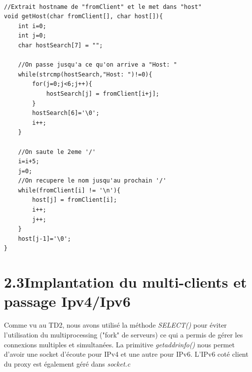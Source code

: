 \documentclass[12pt, a4paper]{report}
\begin{document}
\lstset{language=C}

\renewcommand{\lstlistingname}{Algorithm 2.2.}
\begin{lstlisting}[caption=Algorithme de détermination d'adresse serveur à contacter (messages.c)]

//Extrait hostname de "fromClient" et le met dans "host"
void getHost(char fromClient[], char host[]){
	int i=0;
	int j=0;
	char hostSearch[7] = "";

	//On passe jusqu'a ce qu'on arrive a "Host: "
	while(strcmp(hostSearch,"Host: ")!=0){
		for(j=0;j<6;j++){
			hostSearch[j] = fromClient[i+j];
		}
		hostSearch[6]='\0';
		i++;
	}
	
	//On saute le 2eme '/'
	i=i+5;
	j=0;
	//On recupere le nom jusqu'au prochain '/'
	while(fromClient[i] != '\n'){
		host[j] = fromClient[i];
		i++;
		j++;
	}
	host[j-1]='\0';
}

\end{lstlisting}

\newpage


\section*{\hspace{0.6cm}2.3\hspace{0.6cm}Implantation du multi-clients et passage Ipv4/Ipv6}
\hspace{1cm} Comme vu au TD2, nous avons utilisé la méthode \textit{SELECT()} pour éviter l'utilisation du multiprocessing ("fork" de serveurs) ce qui a permis de gérer les connexions multiples et simultanées. La primitive \textit{getaddrinfo()} nous permet d'avoir une socket d'écoute pour IPv4 et une autre pour IPv6. L'IPv6 coté client du proxy est également géré dans \textit{socket.c}\\

\lstset{language=C}
\end{document}

